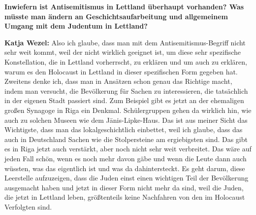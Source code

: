 \textbf{Inwiefern ist Antisemitismus in Lettland überhaupt vorhanden? Was müsste man ändern an Geschichtsaufarbeitung und allgemeinem Umgang mit dem Judentum in Lettland?} 

\textbf{Katja Wezel:} Also ich glaube, dass man mit dem Antisemitismus-Begriff nicht sehr weit kommt, weil der nicht wirklich geeignet ist, um diese sehr spezifische Konstellation, die in Lettland vorherrscht, zu erklären und um auch zu erklären, warum es den Holocaust in Lettland in dieser spezifischen Form gegeben hat. Zweitens denke ich, dass man in Ansätzen schon genau das Richtige macht, indem man versucht, die Bevölkerung für Sachen zu interessieren, die tatsächlich in der eigenen Stadt passiert sind. Zum Beispiel gibt es jetzt an der ehemaligen großen Synagoge in Riga ein Denkmal. Schülergruppen gehen da wirklich hin, wie auch zu solchen Museen wie dem Jānis-Lipke-Haus. Das ist aus meiner Sicht das Wichtigste, dass man das lokalgeschichtlich einbettet, weil ich glaube, dass das auch in Deutschland Sachen wie die Stolpersteine am ergiebigsten sind. Das gibt es in Riga jetzt auch verstärkt, aber noch nicht sehr weit verbreitet. Das wäre auf jeden Fall schön, wenn es noch mehr davon gäbe und wenn die Leute dann auch wüssten, was das eigentlich ist und was da dahintersteckt. Es geht darum, diese Leerstelle aufzuzeigen, dass die Juden einst einen wichtigen Teil der Bevölkerung ausgemacht haben und jetzt in dieser Form nicht mehr da sind, weil die Juden, die jetzt in Lettland leben, größtenteils keine Nachfahren von den im Holocaust Verfolgten sind. 